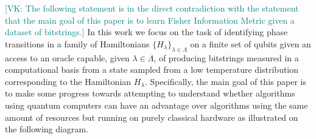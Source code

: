\documentclass[
  american,aps,pra,reprint,floatfix,nofootinbib,superscriptaddress
]{revtex4-2}
\newcommand{\VK}[1]{\textcolor{teal}{[VK: #1]}}
\begin{document}
\VK{The following statement is in the direct contradiction with the statement
that the main goal of this paper is to learn Fisher Information Metric
given a dataset of bitstrings.}
In this work we focus on the task of identifying phase transitions in a
family of Hamiltonians $\{H_{\lambda}\}_{\lambda \in \Lambda}$ on a finite
set of qubits given an access to an oracle capable, given $\lambda \in \Lambda$,
of producing bitstrings measured in a computational basis from a state sampled
from a low temperature distribution corresponding to the Hamiltonian
$H_{\lambda}$. Specifically, the main goal of this paper is to make some
progress towards attempting to understand whether algorithms using
quantum computers can have an advantage over algorithms using the
same amount of resources but running on
purely classical hardware as illustrated on the following diagram.
\begin{center}
  \pgfmathparse{\columnwidth/13cm}%
  \edef\tikzscale{\pgfmathresult}%
\end{center}
\end{document}
